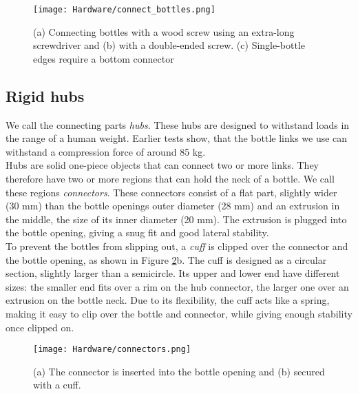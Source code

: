 \begin{figure}[ht!]
    \texttt{[image: Hardware/connect\_bottles.png]}
    \centering
    \caption{(a) Connecting bottles with a wood screw using an extra-long screwdriver and (b) with a double-ended screw. (c) Single-bottle edges require a bottom connector}
    \label{fig:connect_bottles}
\end{figure}

\subsection{Rigid hubs}
We call the connecting parts \textit{hubs}. These hubs are designed to withstand loads in the range of a human weight. Earlier tests show, that the bottle links we use can withstand a compression force of around 85 kg.\\
Hubs are solid one-piece objects that can connect two or more links. They therefore have two or more regions that can hold the neck of a bottle. We call these regions \textit{connectors}. These connectors consist of a flat part, slightly wider (30 mm) than the bottle openings outer diameter (28 mm) and an extrusion in the middle, the size of its inner diameter (20 mm). The extrusion is plugged into the bottle opening, giving a snug fit and good lateral stability.\\
To prevent the bottles from slipping out, a \textit{cuff} is clipped over the connector and the bottle opening, as shown in Figure \ref{fig:connector}b. The cuff is designed as a circular section, slightly larger than a semicircle. Its upper and lower end have different sizes: the smaller end fits over a rim on the hub connector, the larger one over an extrusion on the bottle neck. Due to its flexibility, the cuff acts like a spring, making it easy to clip over the bottle and connector, while giving enough stability once clipped on.

\begin{figure}
    \texttt{[image: Hardware/connectors.png]}
    \caption{(a) The connector is inserted into the bottle opening and (b) secured with a cuff.}
    \centering
    \label{fig:connector}
\end{figure}

